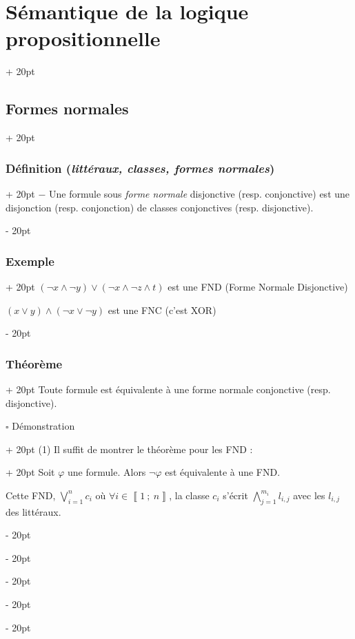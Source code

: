 \documentclass[a4paper, 12pt, twoside]{article}
\newcommand{\nset}[2]{\left\llbracket #1\ ;\ #2 \right\rrbracket}
\newcommand{\ind}[1][20pt]{\advance\leftskip + #1}
\newcommand{\deind}[1][20pt]{\advance\leftskip - #1}
\newenvironment{indt}[2][20pt]{#2 \par \ind[#1]}{\par \deind} %
\begin{document}
\begin{indt}{\section{Sémantique de la logique propositionnelle}}
\begin{indt}{\subsection{Formes normales}}
\begin{indt}{\subsubsection{Définition (\textit{littéraux, classes, formes normales})}}
                $-$ Une formule sous \textit{forme normale} disjonctive (resp. conjonctive) est une disjonction (resp. conjonction) de classes conjonctives (resp. disjonctive).
            \end{indt}
            
            \vspace{12pt}
            
            \begin{indt}{\subsubsection{Exemple}}
                $(\neg x \wedge \neg y) \vee (\neg x \wedge \neg z \wedge t)$ est une FND (Forme Normale Disjonctive)
                
                $(x \vee y) \wedge (\neg x \vee \neg y)$ est une FNC (c'est XOR)
            \end{indt}
            
            \vspace{12pt}
            
            \begin{indt}{\subsubsection{Théorème}}
                Toute formule est équivalente à une forme normale conjonctive (resp. disjonctive).
                
                \vspace{6pt}
                
                \begin{indt}{$\square$ Démonstration}
                    \begin{indt}{(1) Il suffit de montrer le théorème pour les FND :}
                        Soit $\varphi$ une formule. Alors $\neg \varphi$ est équivalente à une FND.
                        
                        Cette FND, $\displaystyle \bigvee_{i = 1}^n c_i$ où $\forall i \in \nset 1 n$, la classe $c_i$ s'écrit $\displaystyle \bigwedge_{j = 1}^{m_i} l_{i, j}$ avec les $l_{i, j}$ des littéraux.
                        

\end{indt}
\end{indt}
\end{indt}
\end{indt}
\end{indt}
\end{document}
